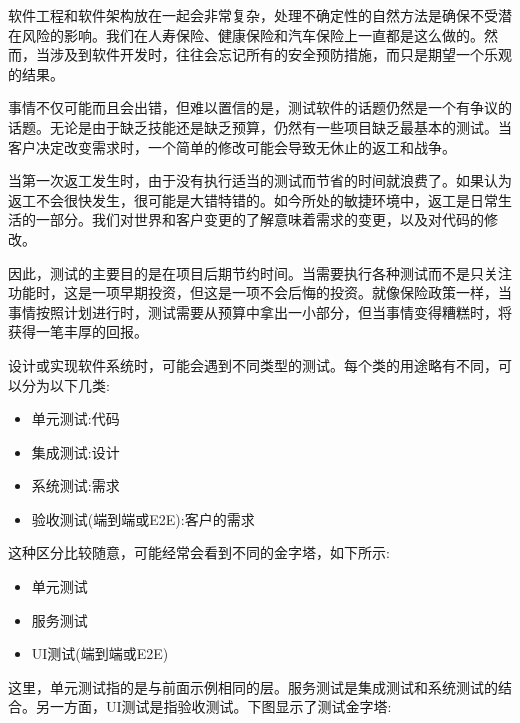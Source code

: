 
软件工程和软件架构放在一起会非常复杂，处理不确定性的自然方法是确保不受潜在风险的影响。我们在人寿保险、健康保险和汽车保险上一直都是这么做的。然而，当涉及到软件开发时，往往会忘记所有的安全预防措施，而只是期望一个乐观的结果。

事情不仅可能而且会出错，但难以置信的是，测试软件的话题仍然是一个有争议的话题。无论是由于缺乏技能还是缺乏预算，仍然有一些项目缺乏最基本的测试。当客户决定改变需求时，一个简单的修改可能会导致无休止的返工和战争。

当第一次返工发生时，由于没有执行适当的测试而节省的时间就浪费了。如果认为返工不会很快发生，很可能是大错特错的。如今所处的敏捷环境中，返工是日常生活的一部分。我们对世界和客户变更的了解意味着需求的变更，以及对代码的修改。

因此，测试的主要目的是在项目后期节约时间。当需要执行各种测试而不是只关注功能时，这是一项早期投资，但这是一项不会后悔的投资。就像保险政策一样，当事情按照计划进行时，测试需要从预算中拿出一小部分，但当事情变得糟糕时，将获得一笔丰厚的回报。


设计或实现软件系统时，可能会遇到不同类型的测试。每个类的用途略有不同，可以分为以下几类:

\begin{itemize}
\item 
单元测试:代码

\item 
集成测试:设计

\item 
系统测试:需求

\item 
验收测试(端到端或E2E):客户的需求
\end{itemize}

这种区分比较随意，可能经常会看到不同的金字塔，如下所示:

\begin{itemize}
\item 
单元测试

\item 
服务测试

\item 
UI测试(端到端或E2E)
\end{itemize}

这里，单元测试指的是与前面示例相同的层。服务测试是集成测试和系统测试的结合。另一方面，UI测试是指验收测试。下图显示了测试金字塔:

